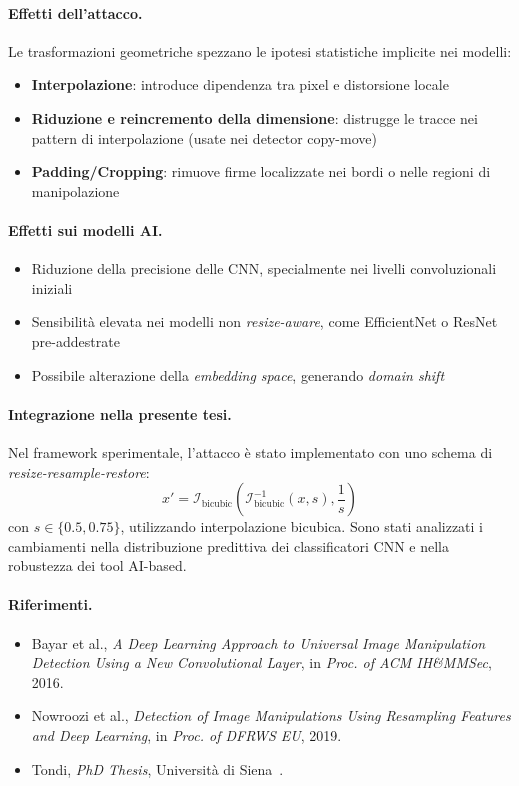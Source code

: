 \paragraph{Effetti dell’attacco.}
Le trasformazioni geometriche spezzano le ipotesi statistiche implicite nei modelli:
\begin{itemize}
    \item \textbf{Interpolazione}: introduce dipendenza tra pixel e distorsione locale
    \item \textbf{Riduzione e reincremento della dimensione}: distrugge le tracce nei pattern di interpolazione (usate nei detector copy-move)
    \item \textbf{Padding/Cropping}: rimuove firme localizzate nei bordi o nelle regioni di manipolazione
\end{itemize}

\paragraph{Effetti sui modelli AI.}
\begin{itemize}
    \item Riduzione della precisione delle CNN, specialmente nei livelli convoluzionali iniziali
    \item Sensibilità elevata nei modelli non \textit{resize-aware}, come EfficientNet o ResNet pre-addestrate
    \item Possibile alterazione della \textit{embedding space}, generando \textit{domain shift}
\end{itemize}

\paragraph{Integrazione nella presente tesi.}
Nel framework sperimentale, l’attacco è stato implementato con uno schema di \textit{resize-resample-restore}:
\[
x' = \mathcal{I}_{\text{bicubic}} \left( \mathcal{I}_{\text{bicubic}}^{-1}(x, s), \frac{1}{s} \right)
\]
con $s \in \{0.5, 0.75\}$, utilizzando interpolazione bicubica. Sono stati analizzati i cambiamenti nella distribuzione predittiva dei classificatori CNN e nella robustezza dei tool AI-based.

\paragraph{Riferimenti.}
\begin{itemize}
    \item Bayar et al., \textit{A Deep Learning Approach to Universal Image Manipulation Detection Using a New Convolutional Layer}, in \textit{Proc. of ACM IH\&MMSec}, 2016.
    \item Nowroozi et al., \textit{Detection of Image Manipulations Using Resampling Features and Deep Learning}, in \textit{Proc. of DFRWS EU}, 2019.
    \item Tondi, \textit{PhD Thesis}, Università di Siena~\cite{phd_unisi_068552}.
\end{itemize}


